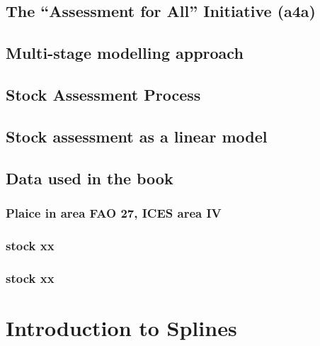 \documentclass[
]{book}
\begin{document}
\hypertarget{the-assessment-for-all-initiative-a4a}{%
\section{The ``Assessment for All'' Initiative (a4a)}\label{the-assessment-for-all-initiative-a4a}}

\hypertarget{multi-stage-modelling-approach}{%
\section{Multi-stage modelling approach}\label{multi-stage-modelling-approach}}

\hypertarget{stock-assessment-process}{%
\section{Stock Assessment Process}\label{stock-assessment-process}}

\hypertarget{stock-assessment-as-a-linear-model}{%
\section{Stock assessment as a linear model}\label{stock-assessment-as-a-linear-model}}

\hypertarget{data-used-in-the-book}{%
\section{Data used in the book}\label{data-used-in-the-book}}

\hypertarget{plaice-in-area-fao-27-ices-area-iv}{%
\subsection{Plaice in area FAO 27, ICES area IV}\label{plaice-in-area-fao-27-ices-area-iv}}

\hypertarget{stock-xx}{%
\subsection{stock xx}\label{stock-xx}}

\hypertarget{stock-xx-1}{%
\subsection{stock xx}\label{stock-xx-1}}

\hypertarget{introduction-to-splines}{%
\chapter{Introduction to Splines}\label{introduction-to-splines}}
\end{document}
